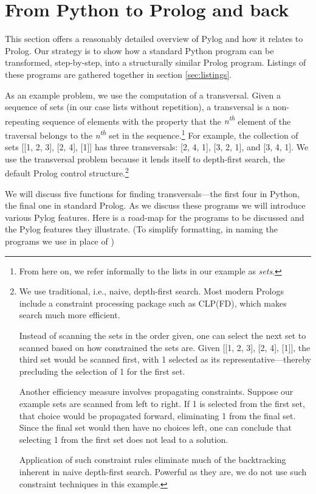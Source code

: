 \section{From Python to Prolog and back}\label{sec:Pylog}
This section offers a reasonably detailed overview of Pylog and how it relates to Prolog. Our strategy is to show how a standard Python program can be transformed, step-by-step, into a structurally similar Prolog program. Listings of these programs are gathered together in section \ref{sec:listings}.

As an example problem, we use the computation of a transversal. Given a sequence of sets (in our case lists without repetition), a transversal is a non-repeating sequence of elements with the property that the \textit{n\textsuperscript{th}} element of the traversal belongs to the \textit{n\textsuperscript{th}} set in the sequence.\footnote{From here on, we refer informally to the lists in our example as \textit{sets}.}  For example, the collection of sets [[1, 2, 3], [2, 4], [1]] has three transversals: [2, 4, 1], [3, 2, 1], and [3, 4, 1]. We use the transversal problem because it lends itself to depth-first search, the default Prolog control structure.\footnote{We use traditional, i.e., naive, depth-first search. Most modern Prologs include a constraint processing package such as CLP(FD)\cite{Triska2016}, which makes search much more efficient.

Instead of scanning the sets in the order given, one can select the next set to scanned based on how constrained the sets are. Given [[1, 2, 3], [2, 4], [1]], the third set would be scanned first, with 1 selected as its representative---thereby precluding the selection of 1 for the first set.

Another efficiency measure involves propagating constraints. Suppose our example sets are scanned from left to right. If 1 is selected from the first set, that choice would be propagated forward, eliminating 1 from the final set. Since the final set would then have no choices left, one can conclude that selecting 1 from the first set does not lead to a solution. 

Application of such constraint rules eliminate much of the backtracking inherent in naive depth-first search. Powerful as they are, we do not use such constraint techniques in this example.}

We will discuss five functions for finding transversals---the first four in Python, the final one in standard Prolog. As we discuss these programs we will introduce various Pylog features. Here is a road-map for the programs to be discussed and the Pylog features they illustrate. (To simplify formatting, in naming the programs we use  in place of )

